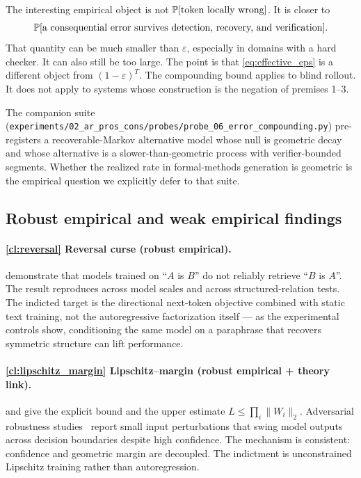 The interesting empirical object is not $\mathbb{P}[\text{token locally wrong}]$.
It is closer to
\begin{equation}
  \mathbb{P}[\text{a consequential error survives detection, recovery, and verification}].
  \label{eq:effective_eps}
\end{equation}
That quantity can be much smaller than $\varepsilon$, especially in domains with a hard checker.
It can also still be too large.
The point is that \cref{eq:effective_eps} is a different object from $(1-\varepsilon)^T$.
The compounding bound applies to blind rollout.
It does not apply to systems whose construction is the negation of premises 1--3.

The companion suite (\texttt{experiments/02\_ar\_pros\_cons/probes/probe\_06\_error\_compounding.py}) pre-registers a recoverable-Markov alternative model whose null is geometric decay and whose alternative is a slower-than-geometric process with verifier-bounded segments.
Whether the realized rate in formal-methods generation is geometric is the empirical question we explicitly defer to that suite.

\subsection{Robust empirical and weak empirical findings}
\label{ssec:empirical}

\paragraph{\ref{cl:reversal} Reversal curse (robust empirical).}
\citet{berglund2023reversal} demonstrate that models trained on ``$A$ is $B$'' do not reliably retrieve ``$B$ is $A$''.
The result reproduces across model scales and across structured-relation tests.
The indicted target is the directional next-token objective combined with static text training, not the autoregressive factorization itself --- as the experimental controls show, conditioning the same model on a paraphrase that recovers symmetric structure can lift performance.

\paragraph{\ref{cl:lipschitz_margin} Lipschitz--margin (robust empirical + theory link).}
\citet{tsuzuku2018lipschitz} and \citet{virmaux2018lipschitz} give the explicit bound and the upper estimate $L \leq \prod_i \|W_i\|_2$.
Adversarial robustness studies~\citep{szegedy2014intriguing,goodfellow2015explaining,carlini2023llm} report small input perturbations that swing model outputs across decision boundaries despite high confidence.
The mechanism is consistent: confidence and geometric margin are decoupled.
The indictment is unconstrained Lipschitz training rather than autoregression.

